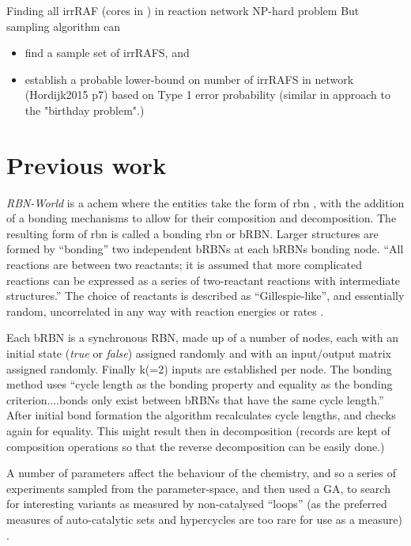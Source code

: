 Finding all irrRAF (cores in \cite{Vasas2012}) in reaction network NP-hard problem \parencite{Steel2013}
But sampling algorithm can 
\begin{itemize}
	\item find a sample set of irrRAFS, and
	\item establish a probable lower-bound on number of irrRAFS in network (Hordijk2015 p7) based on Type 1 error probability (similar in approach to the "birthday problem".)
\end{itemize}



\section{Previous work}\label{previous-work}

\emph{RBN-World} \parencite{Faulconbridge2011} is a \gls{achem} where the entities take the form of \gls{rbn} \parencite{Kauffman:1969ne}, with the addition of a bonding mechanisms to allow for their composition and decomposition. The resulting form of \gls{rbn} is called a bonding \gls{rbn} or bRBN.  Larger structures are formed by ``bonding'' two independent bRBNs at each bRBNs bonding node. ``All reactions are between two reactants; it is assumed that more complicated reactions can be expressed as a series of two-reactant reactions with intermediate structures.'' The choice of reactants is described as ``Gillespie-like'', and essentially random, uncorrelated in any way with reaction energies or rates \parencite[chap.8]{Faulconbridge2011}.

Each bRBN is a synchronous RBN, made up of a number of nodes, each with an initial state (\emph{true} or \emph{false}) assigned randomly and with an input/output matrix assigned randomly. Finally k(=2) inputs are established per node. The bonding method uses ``cycle length as the bonding property and equality as the bonding criterion....bonds only exist between bRBNs that have the same cycle length.'' After initial bond formation the algorithm recalculates cycle lengths, and checks again for equality. This might result then in decomposition (records are kept of composition operations so that the reverse decomposition can be easily done.)

A number of parameters affect the behaviour of the chemistry, and so a series of experiments sampled from the parameter-space, and then used a GA, to search for interesting variants as measured by non-catalysed ``loops'' (as the preferred measures of auto-catalytic sets and \glspl{hypercycle} are too rare for use as a measure) \parencite[chap.8]{Faulconbridge2011}. 

